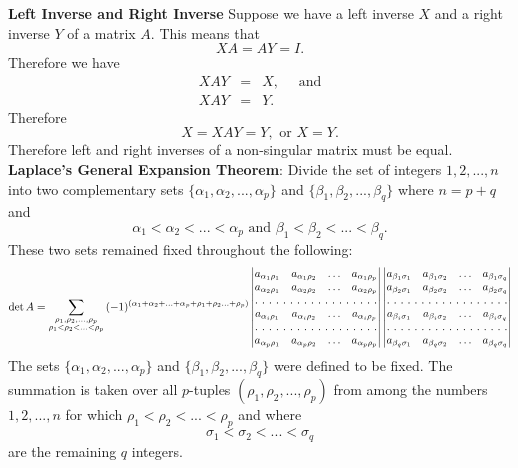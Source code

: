 {\bf Left Inverse and Right Inverse}
Suppose we have a left inverse $X$ and a right inverse $Y$ of a matrix $A$. This means that
\[ XA = AY = I.\] Therefore we have
\begin{eqnarray*}
XAY &=& X, \quad\mbox{ and}\\
XAY &=& Y.
\end{eqnarray*}Therefore
\[X = XAY = Y, \mbox{ or } X=Y.\] Therefore left and right inverses of a non-singular matrix must be equal.\\

{\bf Laplace's General Expansion Theorem}:
Divide the set of integers ${1,2,...,n}$ into two complementary sets $\{\alpha_1, \alpha_2, ..., \alpha_p\}$ and $\{ \beta_1, \beta_2, ..., \beta_q\}$ where $n = p + q$ and
$$\alpha_1 < \alpha_2 < ... < \alpha_p \mbox{ and } \beta_1 < \beta_2 < ... < \beta_q.$$ These two sets remained fixed throughout the following:
\begin{equation}
\det A = \sum_{\substack{\rho_1, \rho_2, ...,\rho_p \\ \rho_1 < \rho_2 < ... < \rho_p}} \, (-1)^{(\alpha_1 + \alpha_2 + ... + \alpha_p + \rho_1 + \rho_2 ... + \rho_p)}
\begin{vmatrix}
a_{\alpha_1\rho_1} & a_{\alpha_1\rho_2} & \hdots & a_{\alpha_1\rho_p} \\
a_{\alpha_2\rho_1} & a_{\alpha_2\rho_2} & \hdots & a_{\alpha_2\rho_p} \\
\hdotsfor[2]{4}\\
a_{\alpha_i\rho_1} & a_{\alpha_i\rho_2} & \hdots & a_{\alpha_i\rho_p} \\
\hdotsfor[2]{4}\\
a_{\alpha_p\rho_1} & a_{\alpha_p\rho_2} & \hdots & a_{\alpha_p\rho_p} \\
\end{vmatrix}
\begin{vmatrix}
a_{\beta_1\sigma_1} & a_{\beta_1\sigma_2} & \hdots & a_{\beta_1\sigma_q} \\
a_{\beta_2\sigma_1} & a_{\beta_2\sigma_2} & \hdots & a_{\beta_2\sigma_q} \\
\hdotsfor[2]{4}\\
a_{\beta_i\sigma_1} & a_{\beta_i\sigma_2} & \hdots & a_{\beta_i\sigma_q} \\
\hdotsfor[2]{4}\\
a_{\beta_q\sigma_1} & a_{\beta_q\sigma_2} & \hdots & a_{\beta_q\sigma_q} \\
\end{vmatrix}
\end{equation}
The sets $\{\alpha_1, \alpha_2, ..., \alpha_p\}$ and $\{ \beta_1, \beta_2, ..., \beta_q\}$ were defined to be fixed.
The summation is taken over all $p$-tuples $(\rho_1, \rho_2, ..., \rho_p)$ from among the numbers $1,2,...,n$ for which $\rho_1 < \rho_2 < ... < \rho_p$ and where
$$\sigma_1 < \sigma_2 < ... < \sigma_q$$ are the remaining $q$ integers.\\